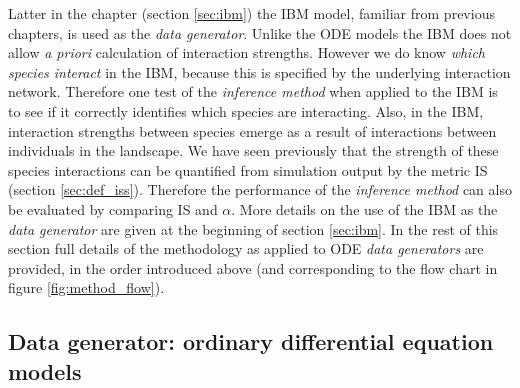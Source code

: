 Latter in the chapter (section \ref{sec:ibm}) the IBM model, familiar from previous chapters, is used as the \emph{data generator}. Unlike the ODE models the IBM does not allow \emph{a priori} calculation of interaction strengths. However we do know \emph{which species interact} in the IBM, because this is specified by the underlying interaction network. Therefore one test of the \emph{inference method} when applied to the IBM is to see if it correctly identifies which species are interacting. Also, in the IBM, interaction strengths between species emerge as a result of interactions between individuals in the landscape. We have seen previously that the strength of these species interactions can be quantified from simulation output by the metric IS (section \ref{sec:def_iss}). Therefore the performance of the \emph{inference method} can also be evaluated by comparing IS and $\alpha$. More details on the use of the IBM as the \emph{data generator} are given at the beginning of section \ref{sec:ibm}. In the rest of this section full details of the methodology as applied to ODE \emph{data generators} are provided, in the order introduced above (and corresponding to the flow chart in figure \ref{fig:method_flow}).


\subsection{Data generator: ordinary differential equation models}
\label{sec:models}

